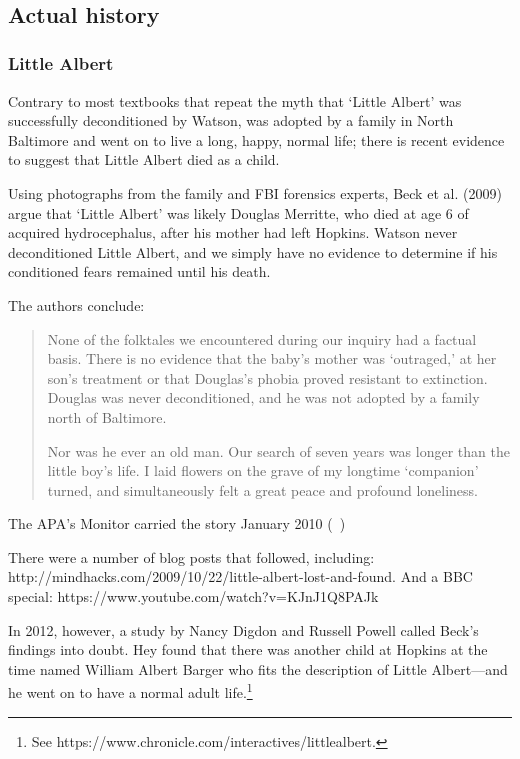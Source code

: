 \begin{refsection}
~\citep{Hogan:1994wi}

\subsection{Actual history}
\label{actualhistory}

\subsubsection{Little Albert}
\label{littlealbert}

Contrary to most textbooks that repeat the myth that `Little Albert' was successfully deconditioned by Watson, was adopted by a family in North Baltimore and went on to live a long, happy, normal life; there is recent evidence to suggest that Little Albert died as a child. 

Using photographs from the family and FBI forensics experts, Beck et al. (2009) argue that `Little Albert' was likely Douglas Merritte, who died at age 6 of acquired hydrocephalus, after his mother had left Hopkins. Watson never deconditioned Little Albert, and we simply have no evidence to determine if his conditioned fears remained until his death. ~\citep{Beck:wk}

The authors conclude:

\begin{quote}

None of the folktales we encountered during our inquiry had a factual basis. There is no evidence that the baby's mother was `outraged‚' at her son's treatment or that Douglas's phobia proved resistant to extinction. Douglas was never deconditioned, and he was not adopted by a family north of Baltimore.

Nor was he ever an old man. Our search of seven years was longer than the little boy's life. I laid flowers on the grave of my longtime `companion' turned, and simultaneously felt a great peace and profound loneliness. ~\citep{Beck:wk}
\end{quote}

The APA's Monitor carried the story January 2010 (~\citep{LittleAlbertrega:2010ig})

There were a number of blog posts that followed, including: http:\slash \slash mindhacks.com\slash 2009\slash 10\slash 22\slash little-albert-lost-and-found. And a BBC special: https:\slash \slash www.youtube.com\slash watch?v=KJnJ1Q8PAJk

In 2012, however, a study by Nancy Digdon and Russell Powell called Beck’s findings into doubt. Hey found that there was another child at Hopkins at the time named William Albert Barger who fits the description of Little Albert---and he went on to have a normal adult life.\footnote{See https:\slash \slash www.chronicle.com\slash interactives\slash littlealbert.} ~\citep{Powell:vw}


\end{refsection}
